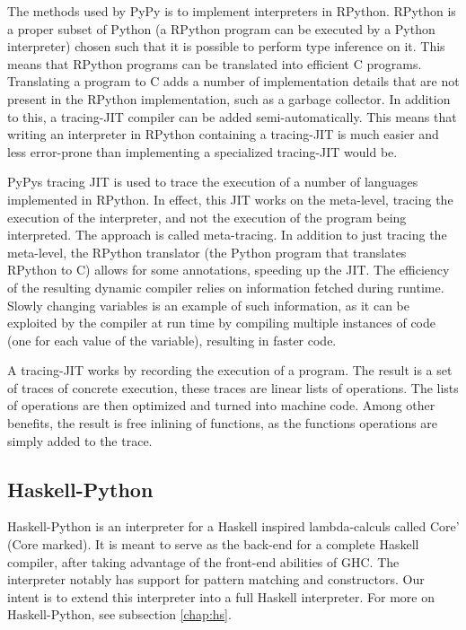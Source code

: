 The methods used by PyPy is to implement interpreters in RPython. RPython is a proper 
subset of Python (a RPython program can be executed by a Python interpreter) 
chosen such that it is possible to perform type inference on it. This
means that RPython programs can be translated into efficient C programs. Translating a 
program to C adds a number of implementation details that are not present in the RPython
implementation, such as a garbage collector. In addition to this, a tracing-JIT compiler 
can be added semi-automatically. This means that writing an interpreter in RPython containing
a tracing-JIT is much easier and less error-prone than implementing a specialized tracing-JIT
would be. 
\cite{bolz2011runtime}

PyPys tracing JIT is used to trace the execution of a number of languages implemented 
in RPython. In effect,
this JIT works on the meta-level, tracing the execution of the interpreter, and not the 
execution of the program being interpreted. The approach is called meta-tracing. In addition
to just tracing the meta-level, the RPython translator (the Python program that translates
RPython to C) allows for some annotations, speeding up the JIT. The efficiency of the 
resulting dynamic compiler relies on information fetched during runtime. Slowly changing 
variables is an example of such information, as it can be exploited by the compiler at 
run time by compiling multiple instances of code (one for each value of the variable),
resulting in faster code. \cite{bolz2011runtime}

A tracing-JIT works by recording the execution of a program. The result is a set of 
traces of concrete execution, these traces are linear lists of operations. The lists of
operations are then optimized and turned into machine code. Among other benefits, the
result is free inlining of functions, as the functions operations are simply added to
the trace. \cite{bolz2011runtime}

\subsection{Haskell-Python}

Haskell-Python\cite{haskellpython}
is an interpreter for a Haskell inspired lambda-calculs called Core' (Core marked).
It is meant to serve as the back-end for a complete Haskell compiler, after taking advantage 
of the front-end abilities of GHC. The interpreter notably has support for pattern matching 
and constructors. Our intent is to extend this interpreter into a full Haskell interpreter.
For more on Haskell-Python, see subsection \ref{chap:hs}.

